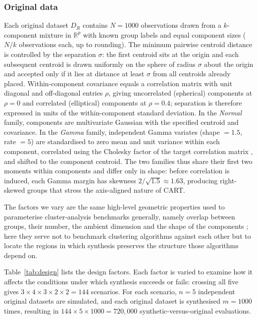 \documentclass[pdflatex,sn-basic]{sn-jnl}
\begin{document}
\subsubsection{Original data}

Each original dataset $D_R$ contains $N = 1000$ observations drawn from a
$k$-component mixture in $\mathbb{R}^p$ with known group labels and equal
component sizes ($N/k$ observations each, up to rounding). The minimum pairwise
centroid distance is controlled by the separation $\sigma$: the first centroid
sits at the origin and each subsequent centroid is drawn uniformly on the
sphere of radius $\sigma$ about the origin and accepted only if it lies at
distance at least $\sigma$ from all centroids already placed. Within-component
covariance equals a correlation matrix with unit diagonal and off-diagonal
entries $\rho$, giving uncorrelated (spherical) components at $\rho = 0$ and
correlated (elliptical) components at $\rho = 0.4$; separation is therefore
expressed in units of the within-component standard deviation. In the
\emph{Normal} family, components are multivariate Gaussian with the specified
centroid and covariance. In the \emph{Gamma} family, independent Gamma variates
(shape $=1.5$, rate $=5$) are standardised to zero mean and unit variance
within each component, correlated using the Cholesky factor of the target
correlation matrix \citep{johnson1987}, and shifted to the component centroid.
The two families thus share their first two moments within components and
differ only in shape: before correlation is induced, each Gamma margin has
skewness $2/\sqrt{1.5} \approx 1.63$, producing right-skewed groups that stress
the axis-aligned nature of CART.

The factors we vary are the same high-level geometric properties used to
parameterise cluster-analysis benchmarks generally, namely overlap between
groups, their number, the ambient dimension and the shape of the components
\citep{qiu2006,zellinger2025}; here they serve not to benchmark clustering
algorithms against each other but to locate the regions in which synthesis
preserves the structure those algorithms depend on.

Table~\ref{tab:design} lists the design factors. Each factor is varied to
examine how it affects the conditions under which synthesis succeeds or fails:
crossing all five gives $3 \times 4 \times 3 \times 2 \times 2 = 144$
scenarios. For each scenario, $n = 5$ independent original datasets are
simulated, and each original dataset is synthesised $m = 1000$ times, resulting
in $144 \times 5 \times 1000 = 720{,}000$ synthetic-versus-original
evaluations.
\end{document}
